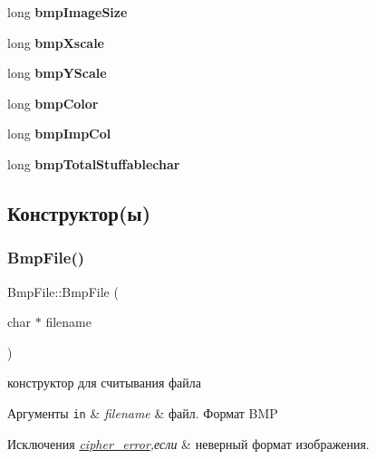 \begin{DoxyCompactItemize}
long {\bfseries bmp\+Image\+Size}
\item 
\mbox{\label{classBmpFile_aefcbdfc073a8dbdb2742f8d03ae8f7de}} 
long {\bfseries bmp\+Xscale}
\item 
\mbox{\label{classBmpFile_a6a57a0ab219996baf7a4df37b0c2f857}} 
long {\bfseries bmp\+Y\+Scale}
\item 
\mbox{\label{classBmpFile_a460c34ddeb210b7785c62896ce2d06ea}} 
long {\bfseries bmp\+Color}
\item 
\mbox{\label{classBmpFile_afc9ef75ec2ce08ec94feb37eaa4a19f1}} 
long {\bfseries bmp\+Imp\+Col}
\item 
\mbox{\label{classBmpFile_a6b16f42aebee776362cc4079951e3ca8}} 
long {\bfseries bmp\+Total\+Stuffablechar}
\end{DoxyCompactItemize}


\subsection{Конструктор(ы)}
\mbox{\label{classBmpFile_aed9f5a62b69ee09e62f75ff70317e027}} 
\subsubsection{\texorpdfstring{Bmp\+File()}{BmpFile()}}
{\footnotesize\ttfamily Bmp\+File\+::\+Bmp\+File (\begin{DoxyParamCaption}\item[{char $\ast$}]{filename }\end{DoxyParamCaption})}



конструктор для считывания файла 


\begin{DoxyParams}[1]{Аргументы}
\mbox{\tt in}  & {\em filename} & файл. Формат B\+MP \\
\hline
\end{DoxyParams}

\begin{DoxyExceptions}{Исключения}
{\em \hyperlink{classcipher__error}{cipher\+\_\+error},если} & неверный формат изображения. \\
\hline
\end{DoxyExceptions}


